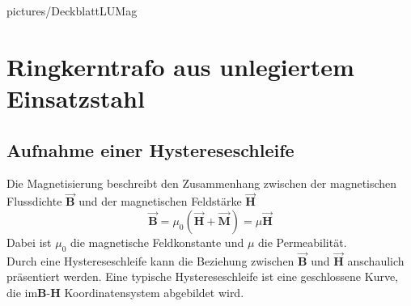 \documentclass[a4paper,twoside,12pt,DIV=13,BCOR=5mm,numbers=noenddot,cleardoublepage=empty]{scrbook}
\begin{document}
\renewcommand{\baselinestretch}{1.25}
\newcommand{\StudentA}{Marton Harsch}
\newcommand{\MatrNrA}{12123680}
\newcommand{\StudentB}{Michael Malburg}
\newcommand{\MatrNrB}{61806515}
\newcommand{\StudentC}{Jonathan Gamperl}
\newcommand{\MatrNrC}{12302766}

\newcommand{\LUDatum}{22.4.2024}
\newcommand{\LUGruppe}{}
\newcommand{\LUBetreuer}{}

\large

{pictures/DeckblattLUMag}     %

\setcounter{chapter}{0}


\chapter{Ringkerntrafo aus unlegiertem Einsatzstahl}
\section{Aufnahme einer Hystereseschleife}

    Die Magnetisierung beschreibt den Zusammenhang zwischen der magnetischen Flussdichte $\Vec{\textbf{B}}$ und der magnetischen Feldstärke $\Vec{\textbf{H}}$
    \begin{equation}
        \Vec{\textbf{B}} = \mu_0 (\Vec{\textbf{H}} + \Vec{\textbf{M}}) = \mu\Vec{\textbf{H}}
    \end{equation} 
    Dabei ist $\mu_0$ die magnetische Feldkonstante und $\mu$ die Permeabilität. \\
    Durch eine Hystereseschleife kann die Beziehung zwischen $\Vec{\textbf{B}}$ und $\Vec{\textbf{H}}$ anschaulich präsentiert werden. Eine typische Hystereseschleife ist eine geschlossene Kurve, die im\textbf{B}-\textbf{H} Koordinatensystem abgebildet wird. \\
    
\end{document}
